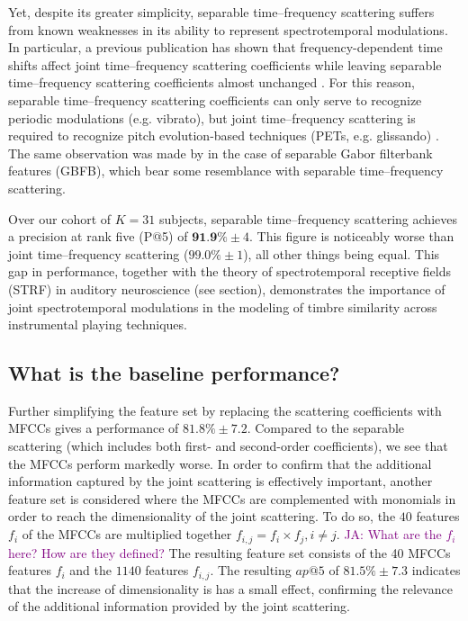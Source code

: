 \documentclass{bmcart}
\newcommand{\lnameref}[1]{%
\bgroup
\let\nmu\MakeLowercase
\nameref{#1}\egroup}
\newcommand{\nmu}{}
\newcommand{\ja}[1]{\textcolor{purple}{JA: #1}\xspace}
\begin{document}
Yet, despite its greater simplicity, separable time--frequency scattering suffers from known weaknesses in its ability to represent spectrotemporal modulations.
In particular, a previous publication has shown that frequency-dependent time shifts affect joint time--frequency scattering coefficients while leaving separable time--frequency scattering coefficients almost unchanged \cite{anden2019tsp}.
For this reason, separable time--frequency scattering coefficients can only serve to recognize periodic modulations (e.g. vibrato), but joint time--frequency scattering is required to recognize pitch evolution-based techniques (PETs, e.g. glissando) \cite{wang2020icassp}.
The same observation was made by \cite{schadler2015jasa} in the case of separable Gabor filterbank features (GBFB), which bear some resemblance with separable time--frequency scattering.

Over our cohort of $K=31$ subjects, separable time--frequency scattering achieves a precision at rank five (P@5) of $\textbf{91.9\%} \pm 4$. This figure is noticeably worse than joint time--frequency scattering ($99.0\% \pm 1$), all other things being equal.
This gap in performance, together with the theory of spectrotemporal receptive fields (STRF) in auditory neuroscience (see \lnameref{sec:soa} section), demonstrates the importance of joint spectrotemporal modulations in the modeling of timbre similarity across instrumental playing techniques.


\subsection*{What is the baseline performance?}
Further simplifying the feature set by replacing the scattering coefficients with MFCCs gives a performance of $81.8\% \pm 7.2$.
Compared to the separable scattering (which includes both first- and second-order coefficients), we see that the MFCCs perform markedly worse.
In order to confirm that the additional information captured by the joint scattering is effectively important, another feature set is considered where the MFCCs are complemented with monomials in order to reach the dimensionality of the joint scattering.
To do so, the $40$ features $f_i$ of the MFCCs are multiplied together $f_{i, j} = f_i \times f_j, i \neq j$.
\ja{What are the $f_i$ here?
How are they defined?}%
The resulting feature set consists of the 40 MFCCs features $f_i$ and the $1140$ features $f_{i, j}$.
The resulting $ap@5$ of $81.5\% \pm 7.3$ indicates that the increase of dimensionality is has a small effect, confirming the relevance of the additional information provided by the joint scattering.
\end{document}
